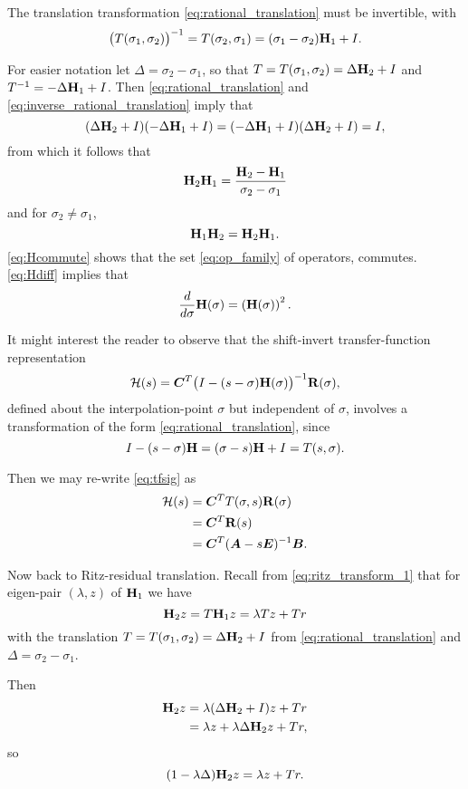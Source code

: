 The translation transformation \eqref{eq:rational_translation} must be invertible, with 
\begin{equation}
\big( T(\sigma_1,\sigma_2)\big)^{-1} = T(\sigma_2,\sigma_1) = (\sigma_1-\sigma_2) \textbf{\textup{H}}_1 + I.
\label{eq:inverse_rational_translation}
\end{equation}

For easier notation let $\Delta=\sigma_2-\sigma_1$, so that $T=T(\sigma_1,\sigma_2)=\Delta \textbf{\textup{H}}_2 + I$ and $T^{-1}=-\Delta \textbf{\textup{H}}_1 + I$. Then \eqref{eq:rational_translation} and \eqref{eq:inverse_rational_translation} imply that 
\[
(\Delta \textbf{\textup{H}}_2 + I)(-\Delta \textbf{\textup{H}}_1 + I) = (-\Delta \textbf{\textup{H}}_1 + I) (\Delta \textbf{\textup{H}}_2 + I)=I,
\]
from which it follows that
\begin{equation}
 \textbf{\textup{H}}_2 \textbf{\textup{H}}_1 = \frac{\textbf{\textup{H}}_2 - \textbf{\textup{H}}_1}{\sigma_2 - \sigma_1}
\label{eq:Hdiff}
\end{equation}
and for $\sigma_2\neq\sigma_1$,
\begin{equation}
\textbf{\textup{H}}_1 \textbf{\textup{H}}_2 = \textbf{\textup{H}}_2 \textbf{\textup{H}}_1.
\label{eq:Hcommute}
\end{equation}
\eqref{eq:Hcommute} shows that the set \eqref{eq:op_family} of operators, commutes.   \eqref{eq:Hdiff} implies that 
\[
\frac{d}{d\sigma} \textbf{\textup{H}}(\sigma)=\left(\textbf{\textup{H}}(\sigma)\right)^2.
\]

It might interest the reader to observe that the shift-invert transfer-function representation
\begin{equation}
\mathcal{H}(s) = \bm{C}^T\big(I - (s-\sigma) \textbf{\textup{H}}(\sigma)\big)^{-1}\textbf{\textup{R}}(\sigma),
\label{eq:tfsig}
\end{equation}
defined about the interpolation-point $\sigma$ but independent of $\sigma$, involves a transformation of the form \eqref{eq:rational_translation}, since 
\[
I - (s-\sigma) \textbf{\textup{H}} = (\sigma - s)\textbf{\textup{H}} + I=T(s,\sigma).
\]

Then we may re-write \eqref{eq:tfsig} as
\begin{align*}
\mathcal{H}(s) &= \bm{C}^T T(\sigma,s)\textbf{\textup{R}}(\sigma) \\
&= \bm{C}^T \textbf{\textup{R}}(s)\\
&= \bm{C}^T (\bm{A}- s \bm{E})^{-1} \bm{B}.
\end{align*}

Now back to Ritz-residual translation.   Recall from \eqref{eq:ritz_transform_1} that for eigen-pair $(\lambda,z)$ of $\textbf{\textup{H}}_1$ we have 
\[
\textbf{\textup{H}}_2 z = T \textbf{\textup{H}}_1 z  = \lambda T z +  T r
\]
 with the translation $T=T(\sigma_1,\sigma_2)=\Delta \textbf{\textup{H}}_2+I$  from \eqref{eq:rational_translation} and $\Delta = \sigma_2 - \sigma_1$.

Then 
\begin{align*}
\textbf{\textup{H}}_2 z &= \lambda (\Delta \textbf{\textup{H}}_2 + I)z + Tr\\
&= \lambda z + \lambda \Delta \textbf{\textup{H}}_2 z +T r, 
\label{eq:Rtiz_resid_translation}
\end{align*}
so
\begin{equation}
(1-\lambda \Delta)\textbf{\textup{H}}_2 z  = \lambda z + T r.
\end{equation}

